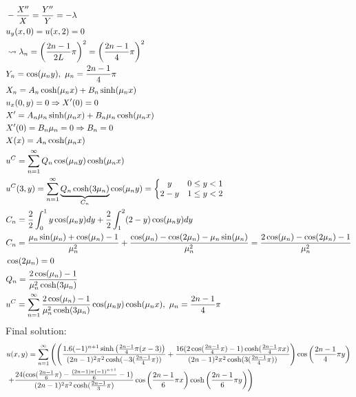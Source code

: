 \documentclass[11pt, fleqn]{article}
\begin{document}
\begin{align*}
    &-\frac{X''}{X}=\frac{Y''}{Y}=-\lambda\\
    &u_y(x,0)=u(x,2)=0\\
    &\leadsto \lambda_n=\brround{\frac{2n-1}{2L}\pi}^2=\brround{\frac{2n-1}{4}\pi}^2\\
    &Y_n=\cos(\mu_n y),\ \mu_n=\frac{2n-1}{4}\pi\\
    &X_n=A_n\cosh(\mu_nx)+B_n\sinh(\mu_nx)\\
    &u_x(0,y)=0\Ra X'(0)=0\\
    &X'=A_n\mu_n\sinh(\mu_nx)+B_n\mu_n\cosh(\mu_nx)\\
    &X'(0)=B_n\mu_n=0\Ra B_n=0\\
    &X(x)=A_n\cosh(\mu_nx)\\
    &u^C=\sum_{n=1}^\infty Q_n\cos(\mu_n y)\cosh(\mu_n x)\\
    &u^C(3,y)=\sum_{n=1}^\infty \underbrace{Q_n\cosh(3\mu_n)}_{C_n}\cos(\mu_ny)=\eqnsystem{y & 0\leq y<1\\ 2-y & 1\leq y <2}\\
    &C_n=\frac{2}{2}\int_0^1y\cos(\mu_ny)dy+\frac{2}{2}\int_1^2(2-y)\cos(\mu_ny)dy\\
    &C_n=\frac{\mu_n\sin(\mu_n)+\cos(\mu_n)-1}{\mu_n^2}+\frac{\cos(\mu_n)-\cos(2\mu_n)-\mu_n\sin(\mu_n)}{\mu_n^2}=\frac{2\cos(\mu_n)-\cos(2\mu_n)-1}{\mu_n^2}\\
    &\cos(2\mu_n)=0\\
    &Q_n=\frac{2\cos(\mu_n)-1}{\mu_n^2\cosh(3\mu_n)}\\
    &u^C=\sum_{n=1}^\infty\frac{2\cos(\mu_n)-1}{\mu_n^2\cosh(3\mu_n)}\cos(\mu_ny)\cosh(\mu_nx),\ \mu_n=\frac{2n-1}{4}\pi
\end{align*}
Final solution:
\begin{align*}
    &u(x,y)=\sum_{n=1}^\infty\left(\left( \frac{1.6(-1)^{n+1}\sinh\left( \frac{2n-1}{4}\pi(x-3) \right)}{(2n-1)^2\pi^2\cosh(-3(\frac{2n-1}{4}\pi))}+\frac{16(2\cos(\frac{2n-1}{4}\pi)-1)\cosh(\frac{2n-1}{4}\pi x)}{(2n-1)^2\pi^2\cosh(3(\frac{2n-1}{4}\pi))} \right)\cos\left( \frac{2n-1}{4}\pi y \right)\right.\\
    &\left.+\frac{24(\cos(\frac{2n-1}{6}\pi)-\frac{(2n-1)\pi(-1)^{n+1}}{6}-1)}{(2n-1)^2\pi^2\cosh(\frac{2n-1}{3}\pi)}\cos\left( \frac{2n-1}{6}\pi x \right)\cosh\left( \frac{2n-1}{6}\pi y \right)\right)
\end{align*}
\end{document}
